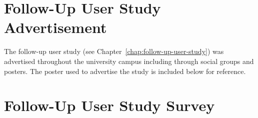 \chapter{Follow-Up User Study Advertisement}
\label{appendix:follow-up-user-study-advertisement}

The follow-up user study (see Chapter~\ref{chap:follow-up-user-study}) was advertised throughout the university campus including through social groups and posters. The poster used to advertise the study is included below for reference.

\clearpage

\begin{center}
\end{center}

\chapter{Follow-Up User Study Survey}
\label{appendix:follow-up-user-study-survey}

